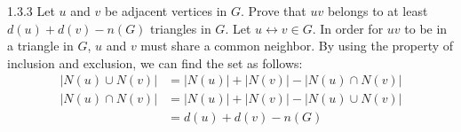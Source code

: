 \documentclass[10pt]{extarticle}
\title{}
\author{Avinash Iyer}
\date{}
\begin{document}
  \begin{problem}{1.3.3}
    Let $u$ and $v$ be adjacent vertices in $G$. Prove that $uv$ belongs to at least $d(u) + d(v) - n(G)$ triangles in $G$.
    \tcblower
    Let $u\leftrightarrow v \in G$. In order for $uv$ to be in a triangle in $G$, $u$ and $v$ must share a common neighbor. By using the property of inclusion and exclusion, we can find the set as follows:
    \begin{align*}
      |N(u) \cup N(v)| &= |N(u)| + |N(v)| - |N(u) \cap N(v)| \\
      |N(u) \cap N(v)| &= |N(u)| + |N(v)| - |N(u) \cup N(v)| \\
                       &= d(u) + d(v) - n(G)
    \end{align*}

  \end{problem}
\end{document}
